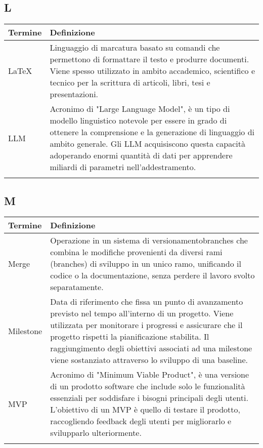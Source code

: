 \documentclass[10pt]{article}
\begin{document}
\subsection{L} %
\begin{tabularx}{\textwidth}{|>{\centering\arraybackslash}l|X|}
\hline
\rowcolor[gray]{0.8}
\textbf{Termine} & \textbf{Definizione}\\
\hline
\LaTeX & Linguaggio di marcatura basato su comandi che permettono di formattare il testo e produrre documenti. Viene spesso utilizzato in ambito accademico, scientifico e tecnico per la scrittura di articoli, libri, tesi e presentazioni.\\
\hline
LLM & Acronimo di "Large Language Model", è un tipo di modello linguistico notevole per essere in grado di ottenere la comprensione e la generazione di linguaggio di ambito generale. Gli LLM acquisiscono questa capacità adoperando enormi quantità di dati per apprendere miliardi di parametri nell'addestramento.\\
\hline
 & \\
\hline
\end{tabularx}
 
\subsection{M} %
\begin{tabularx}{\textwidth}{|>{\centering\arraybackslash}l|X|}
\hline
\rowcolor[gray]{0.8}
\textbf{Termine} & \textbf{Definizione}\\
\hline
Merge & Operazione in un sistema di versionamentobranches che combina le modifiche provenienti da diversi rami (branches) di sviluppo in un unico ramo, unificando il codice o la documentazione, senza perdere il lavoro svolto separatamente.\\
\hline
Milestone & Data di riferimento che fissa un punto di avanzamento previsto nel tempo all'interno di un progetto. Viene utilizzata per monitorare i progressi e assicurare che il progetto rispetti la pianificazione stabilita. Il raggiungimento degli obiettivi associati ad una milestone viene sostanziato attraverso lo sviluppo di una baseline.\\
\hline
MVP & Acronimo di "Minimum Viable Product", è una versione di un prodotto software che include solo le funzionalità essenziali per soddisfare i bisogni principali degli utenti. L'obiettivo di un MVP è quello di testare il prodotto, raccogliendo feedback degli utenti per migliorarlo e svilupparlo ulteriormente.\\
\hline
& \\
\hline
\end{tabularx}
\end{document}
